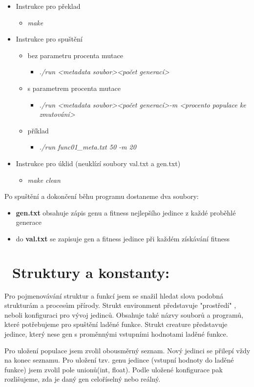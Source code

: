 \documentclass{article}
\begin{document}
\begin{itemize}
\item Instrukce pro překlad
\begin{itemize}
\item \textit{make}
\end{itemize}
\item Instrukce pro spuštění
\begin{itemize}
\item bez parametru procenta mutace 
\begin{itemize}
\item \textit{./run \textless metadata soubor\textgreater  \textless počet generací\textgreater}
\end{itemize}
\item s parametrem procenta mutace
\begin{itemize}
\item \textit{./run \textless metadata soubor\textgreater  \textless počet generací\textgreater -m \textless procento populace ke zmutování\textgreater}
\end{itemize}
\item příklad
\begin{itemize}
\item \textit{./run func01\_meta.txt 50 -m 20}
\end{itemize}
\end{itemize}
\item Instrukce pro úklid (neuklízí soubory val.txt a gen.txt)
\begin{itemize}
\item \textit{make clean}
\end{itemize}
\end{itemize}

\noindent
Po spuštění a dokončení běhu programu dostaneme dva soubory:
\begin{itemize}
\item \textbf{gen.txt} obsahuje zápis genu a fitness nejlepšího jedince z každé proběhlé generace
\item do \textbf{val.txt} se zapisuje gen a fitness jedince při každém získávání fitness
\end{itemize}


\section{ \ Struktury a konstanty:}

Pro pojmenovávání struktur a funkcí jsem se snažil hledat slova podobná strukturám a procesům přírody. Strukt environment představuje "prostředí" , neboli konfiguraci pro vývoj jedinců. Obsahuje také názvy souborů a programů, které potřebujeme pro spuštění laděné funkce. Strukt creature představuje jedince, který nese gen s proměnnými vstupními hodnotami laděné funkce. \par
Pro uložení populace jsem zvolil obousměrný seznam. Nový jedinci se přilepí vždy na konec seznamu. Pro uložení tzv. genu jedince (vstupní hodnoty do laděné funkce) jsem zvolil pole unionů(int, float). Podle uložené konfigurace pak rozlišujeme, zda je daný gen celoříselný nebo reálný.
\end{document}
